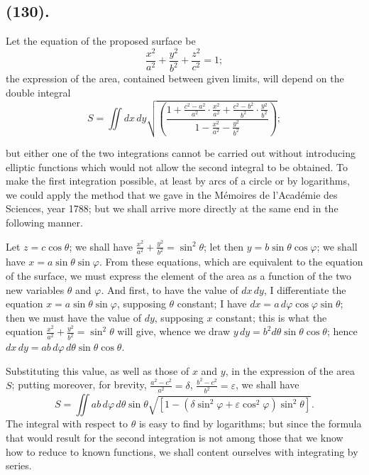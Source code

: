 \documentclass{article}
\begin{document}
\subsection*{(130).}

Let the equation of the proposed surface be
\[ \frac{x^{2}}{a^{2}}+\frac{y^{2}}{b^{2}}+\frac{z^{2}}{c^{2}}=1; \]
the expression of the area, contained between given limits, will depend on the double integral
\[ S=\iint dx\,dy\sqrt{\left(\frac{1+\frac{c^{2}-a^{2}}{a^{2}}\cdot\frac{x^{2}}{a^{2}}+\frac{c^{2}-b^{2}}{b^{2}}\cdot\frac{y^{2}}{b^{2}}}{1-\frac{x^{2}}{a^{2}}-\frac{y^{2}}{b^{2}}}\right)}; \]

but either one of the two integrations cannot be carried out without introducing elliptic functions which would not allow the second integral to be obtained. To make the first integration possible, at least by arcs of a circle or by logarithms, we could apply the method that we gave in the Mémoires de l'Académie des Sciences, year 1788; but we shall arrive more directly at the same end in the following manner.

Let $z=c\cos\theta$; we shall have $\frac{x^{2}}{a^{2}}+\frac{y^{2}}{b^{2}}=\sin^{2}\theta$; let then $y=b\sin\theta\cos\varphi$; we shall have $x=a\sin\theta\sin\varphi$. From these equations, which are equivalent to the equation of the surface, we must express the element of the area as a function of the two new variables $\theta$ and $\varphi$. And first, to have the value of $dx\,dy$, I differentiate the equation $x=a\sin\theta\sin\varphi$, supposing $\theta$ constant; I have $dx=a\,d\varphi\cos\varphi\sin\theta$; then we must have the value of $dy$, supposing $x$ constant; this is what the equation $\frac{x^{2}}{a^{2}}+\frac{y^{2}}{b^{2}}=\sin^{2}\theta$ will give, whence we draw $y\,dy=b^{2}d\theta\sin\theta\cos\theta$; hence $dx\,dy=ab\,d\varphi\,d\theta\sin\theta\cos\theta$.

Substituting this value, as well as those of $x$ and $y$, in the expression of the area $S$; putting moreover, for brevity, $\frac{a^{2}-c^{2}}{a^{2}}=\delta$, $\frac{b^{2}-c^{2}}{b^{2}}=\varepsilon$, we shall have
\[ S=\iint ab\,d\varphi\,d\theta\sin\theta\sqrt{[1-(\delta\sin^{2}\varphi+\varepsilon\cos^{2}\varphi)\sin^{2}\theta]}. \]
The integral with respect to $\theta$ is easy to find by logarithms; but since the formula that would result for the second integration is not among those that we know how to reduce to known functions, we shall content ourselves with integrating by series.
\end{document}
